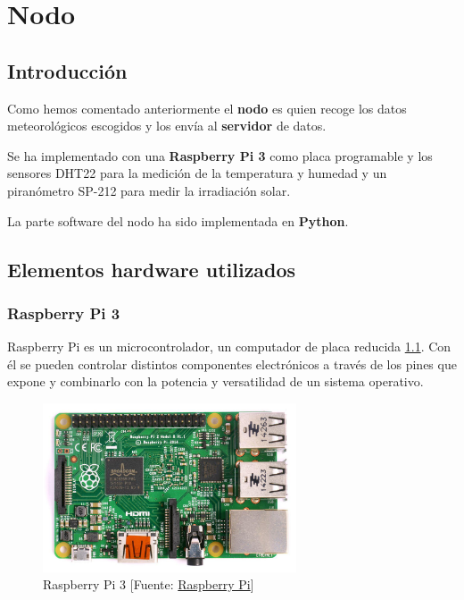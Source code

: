 \cleardoublepage

\chapter{Nodo}
\label{makereference2}

\section{Introducción}
\label{makereference2.1}
Como hemos comentado anteriormente el \textbf{nodo} es quien recoge los datos meteorológicos escogidos y los envía al \textbf{servidor} de datos.

Se ha implementado con una \textbf{Raspberry Pi 3} como placa programable y los sensores DHT22 para la medición de la temperatura y humedad y un piranómetro SP-212 para medir la irradiación solar.

La parte software del nodo ha sido implementada en \textbf{Python}.


\section{Elementos hardware utilizados}
\label{makereference2.2}

\subsection{Raspberry Pi 3}
\label{makereference2.2.1}

Raspberry Pi es un microcontrolador, un computador de placa reducida \ref{rasp}. Con él se pueden controlar distintos componentes electrónicos a través de los pines que expone y combinarlo con la potencia y versatilidad de un sistema operativo.

\begin{figure}[htb]
	\begin{center}
		\includegraphics[height=5cm]{figures/Raspberry_Pi.jpg}
		\caption{Raspberry Pi 3 [Fuente: \href{https://www.raspberrypi.org}{Raspberry Pi}]}
	\end{center}
	
	\label{rasp}
\end{figure}


